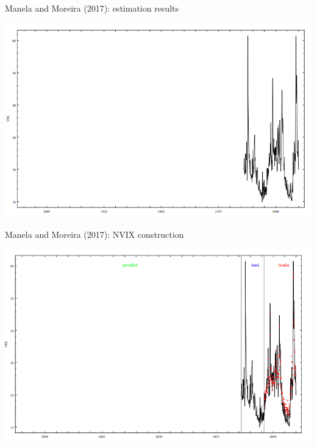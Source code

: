\documentclass[english]{beamer}
\begin{document}
\begin{frame}{\small{Manela and Moreira (2017): estimation results}}
\vspace{-7pt}
\begin{center}
\includegraphics[scale=0.45]{Images/mm2017pre-1.png}
\end{center}
\end{frame}%

\begin{frame}{\small{Manela and Moreira (2017): NVIX construction}}
\vspace{-7pt}
\begin{center}
\includegraphics[scale=0.45]{Images/mm2017pre-2.png}
\end{center}
\end{frame}%
\end{document}

